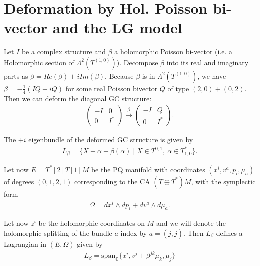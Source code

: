 \documentclass{article}
\newcommand{\TT}{{T\oplus T^*}}
\newcommand{\ap}{\alpha}
\def\w{\wedge}
\theoremstyle{definition}
\theoremstyle{definition}
\theoremstyle{remark}
\theoremstyle{ref}
\begin{document}
\section{Deformation by Hol. Poisson bi-vector and the LG model}
Let $I$ be a complex structure and $\beta$ a holomorphic Poisson bi-vector (i.e. a Holomorphic section of $\Lambda^2(T^{(1,0)})$). Decompose $\beta$ into its real and imaginary parts as $\beta=Re(\beta)+iIm(\beta)$. Because $\beta$ is in $\Lambda^2(T^{(1,0)})$, we have $\beta=-\frac{1}{4}(IQ+iQ)$ for some real Poisson bivector $Q$ of type $(2,0)+(0,2)$. Then we can deform the diagonal GC structure:
\begin{align*}
\begin{pmatrix}
-I & 0 \\
0 & I^*
\end{pmatrix}
\overset{\beta}{\longmapsto}
\begin{pmatrix}
-I & Q \\
0 & I^*
\end{pmatrix}.
\end{align*}

The $+i$ eigenbundle of the deformed GC structure is given by
\begin{align*}
L_\beta=\{X+\ap+\beta(\ap)\mid X\in T^{0,1},\ \ap \in T^*_{1,0}\}.
\end{align*}

Let now $E=T^*[2]T[1]M$ be the PQ manifold with coordinates $(x^i,v^a,p_i,\mu_a)$ of degrees $(0,1,2,1)$ corresponding to the CA $(\TT)M$, with the symplectic form
\begin{align*}
\Omega= dx^i\w dp_i+dv^a\w d\mu_a.
\end{align*}

Let now $z^i$ be the holomorphic coordinates on $M$ and we will denote the holomorphic splitting of the bundle $a$-index by $a=(j,\bar{j})$. Then $L_\beta$ defines a Lagrangian in $(E,\Omega)$ given by
\begin{align*}
L_\beta=\text{span}_{\mathbb C}\{x^i,v^j+\beta^{jk}\mu_k,\mu_{\bar{j}}\}
\end{align*}
\end{document}
